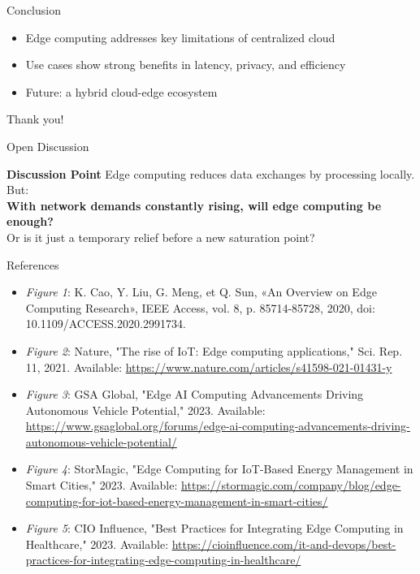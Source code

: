 \documentclass{beamer}
\begin{document}
\begin{frame}{Conclusion}
    \begin{itemize}
      \item Edge computing addresses key limitations of centralized cloud
      \item Use cases show strong benefits in latency, privacy, and efficiency
      \item Future: a hybrid cloud-edge ecosystem
    \end{itemize}
    \vspace{0.3cm}
    Thank you!
  \end{frame}

\begin{frame}{Open Discussion}
  \begin{block}{\textbf{Discussion Point}}
    Edge computing reduces data exchanges by processing locally. But:\\
    \textbf{With network demands constantly rising, will edge computing be enough?}\\
    Or is it just a temporary relief before a new saturation point?
  \end{block}
\end{frame}

\begin{frame}{References}
    \footnotesize
    \begin{itemize}
        \item \textit{Figure 1}: K. Cao, Y. Liu, G. Meng, et Q. Sun, «An Overview on Edge Computing Research», IEEE Access, vol. 8, p. 85714-85728, 2020, doi: 10.1109/ACCESS.2020.2991734.
        \item \textit{Figure 2}: Nature, "The rise of IoT: Edge computing applications," Sci. Rep. 11, 2021. Available: \url{https://www.nature.com/articles/s41598-021-01431-y}
        \item \textit{Figure 3}: GSA Global, "Edge AI Computing Advancements Driving Autonomous Vehicle Potential," 2023. Available: \url{https://www.gsaglobal.org/forums/edge-ai-computing-advancements-driving-autonomous-vehicle-potential/}
        \item \textit{Figure 4}: StorMagic, "Edge Computing for IoT-Based Energy Management in Smart Cities," 2023. Available: \url{https://stormagic.com/company/blog/edge-computing-for-iot-based-energy-management-in-smart-cities/}
        \item \textit{Figure 5}: CIO Influence, "Best Practices for Integrating Edge Computing in Healthcare," 2023. Available: \url{https://cioinfluence.com/it-and-devops/best-practices-for-integrating-edge-computing-in-healthcare/}
    \end{itemize}
\end{frame}
\end{document}

